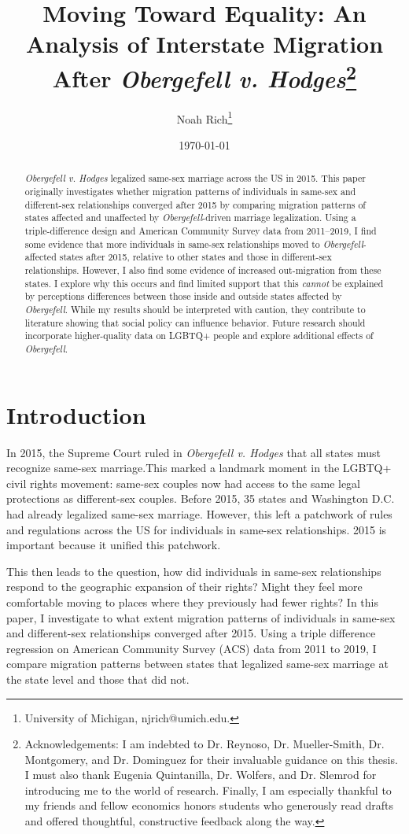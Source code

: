 \documentclass[12pt,letterpaper]{article}
\title{Moving Toward Equality: An Analysis of Interstate Migration After \textit{Obergefell v. Hodges}\footnote{Acknowledgements: I am indebted to Dr. Reynoso, Dr. Mueller-Smith, Dr. Montgomery, and Dr. Dominguez for their invaluable guidance on this thesis. I must also thank Eugenia Quintanilla, Dr. Wolfers, and Dr. Slemrod for introducing me to the world of research. Finally, I am especially thankful to my friends and fellow economics honors students who generously read drafts and offered thoughtful, constructive feedback along the way.}}
\author{Noah Rich\footnote{University of Michigan, njrich@umich.edu.}}
\date{\today}
\begin{document}
\doublespacing

\maketitle


\begin{abstract}
\textit{Obergefell v. Hodges} legalized same-sex marriage across the US in 2015. This paper originally investigates whether migration patterns of individuals in same-sex and different-sex relationships converged after 2015 by comparing migration patterns of states affected and unaffected by \textit{Obergefell}-driven marriage legalization. Using a triple-difference design and American Community Survey data from 2011–2019, I find some evidence that more individuals in same-sex relationships moved to \textit{Obergefell}-affected states after 2015, relative to other states and those in different-sex relationships. However, I also find some evidence of increased out-migration from these states. I explore why this occurs and find limited support that this \textit{cannot} be explained by perceptions differences between those inside and outside states affected by \textit{Obergefell}. While my results should be interpreted with caution, they contribute to literature showing that social policy can influence behavior. Future research should incorporate higher-quality data on LGBTQ+ people and explore additional effects of \textit{Obergefell}.
\end{abstract}

\newpage

\section{Introduction}

In 2015, the Supreme Court ruled in \textit{Obergefell v. Hodges} that all states must recognize same-sex marriage.This marked a landmark moment in the LGBTQ+ civil rights movement: same-sex couples now had access to the same legal protections as different-sex couples. Before 2015, 35 states and Washington D.C. had already legalized same-sex marriage. However, this left a patchwork of rules and regulations across the US for individuals in same-sex relationships. 2015 is important because it unified this patchwork.

This then leads to the question, how did individuals in same-sex relationships respond to the geographic expansion of their rights? Might they feel more comfortable moving to places where they previously had fewer rights? In this paper, I investigate to what extent migration patterns of individuals in same-sex and different-sex relationships converged after 2015. Using a triple difference regression on American Community Survey (ACS) data from 2011 to 2019, I compare migration patterns between states that legalized same-sex marriage at the state level and those that did not.
\end{document}

